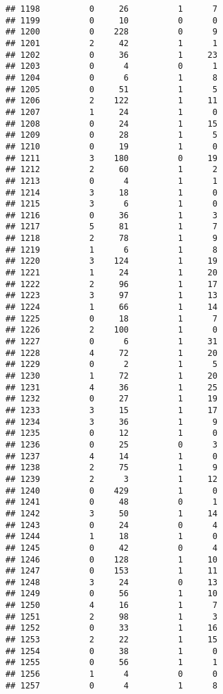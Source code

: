 \documentclass[]{article}
\begin{document}
\begin{verbatim}
## 1198          0     26          1      7
## 1199          0     10          0      0
## 1200          0    228          0      9
## 1201          2     42          1      1
## 1202          0     36          1     23
## 1203          0      4          0      1
## 1204          0      6          1      8
## 1205          0     51          1      5
## 1206          2    122          1     11
## 1207          1     24          1      0
## 1208          0     24          1     15
## 1209          0     28          1      5
## 1210          0     19          1      0
## 1211          3    180          0     19
## 1212          2     60          1      2
## 1213          0      4          1      1
## 1214          3     18          1      0
## 1215          3      6          1      0
## 1216          0     36          1      3
## 1217          5     81          1      7
## 1218          2     78          1      9
## 1219          1      6          1      8
## 1220          3    124          1     19
## 1221          1     24          1     20
## 1222          2     96          1     17
## 1223          3     97          1     13
## 1224          1     66          1     14
## 1225          0     18          1      7
## 1226          2    100          1      0
## 1227          0      6          1     31
## 1228          4     72          1     20
## 1229          0      2          1      5
## 1230          1     72          1     20
## 1231          4     36          1     25
## 1232          0     27          1     19
## 1233          3     15          1     17
## 1234          3     36          1      9
## 1235          0     12          1      0
## 1236          0     25          0      3
## 1237          4     14          1      0
## 1238          2     75          1      9
## 1239          2      3          1     12
## 1240          0    429          1      0
## 1241          0     48          0      1
## 1242          3     50          1     14
## 1243          0     24          0      4
## 1244          1     18          1      0
## 1245          0     42          0      4
## 1246          0    128          1     10
## 1247          0    153          1     11
## 1248          3     24          0     13
## 1249          0     56          1     10
## 1250          4     16          1      7
## 1251          2     98          1      3
## 1252          0     33          1     16
## 1253          2     22          1     15
## 1254          0     38          1      0
## 1255          0     56          1      1
## 1256          1      4          0      0
## 1257          0      4          1      8

\end{verbatim}
\end{document}
